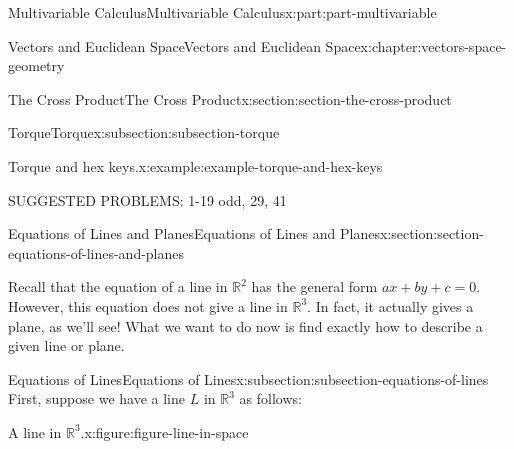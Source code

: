 \documentclass[twoside,10pt,]{book}
\numberwithin{equation}{part}
\newcommand{\RR}{\mathbb{R}}
\begin{document}
\begin{partptx}{Multivariable Calculus}{}{Multivariable Calculus}{}{}{x:part:part-multivariable}
\begin{chapterptx}{Vectors and Euclidean Space}{}{Vectors and Euclidean Space}{}{}{x:chapter:vectors-space-geometry}
\begin{sectionptx}{The Cross Product}{}{The Cross Product}{}{}{x:section:section-the-cross-product}
\begin{subsectionptx}{Torque}{}{Torque}{}{}{x:subsection:subsection-torque}
\begin{example}{Torque and hex keys.}{x:example:example-torque-and-hex-keys}
\end{example}
\end{subsectionptx}
\begin{conclusion}{}%
SUGGESTED PROBLEMS: 1-19 odd, 29, 41%
\end{conclusion}%
\end{sectionptx}
%
%
\typeout{************************************************}
\typeout{************************************************}
%
\begin{sectionptx}{Equations of Lines and Planes}{}{Equations of Lines and Planes}{}{}{x:section:section-equations-of-lines-and-planes}
\begin{introduction}{}%
Recall that the equation of a line in \(\RR^{2}\) has the general form \(ax+by + c = 0\). However, this equation does not give a line in \(\RR^{3}\). In fact, it actually gives a plane, as we'll see! What we want to do now is find exactly how to describe a given line or plane.%
\end{introduction}%
%
%
\typeout{************************************************}
\typeout{************************************************}
%
\begin{subsectionptx}{Equations of Lines}{}{Equations of Lines}{}{}{x:subsection:subsection-equations-of-lines}
First, suppose we have a line \(L\) in \(\RR^{3}\) as follows:%
\begin{figureptx}{A line in \(\mathbb{R}^{3}\).}{x:figure:figure-line-in-space}{}%
\begin{image}{0.05}{0.9}{0.05}%
\end{image}
\end{figureptx}
\end{subsectionptx}
\end{sectionptx}
\end{chapterptx}
\end{partptx}
\end{document}

